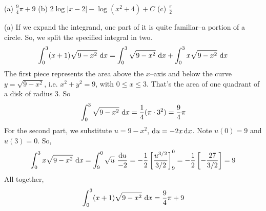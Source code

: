 \begin{answer} (a)
$\displaystyle\frac{9}{4}\pi + 9
$
\qquad (b)
$\displaystyle2 \log |x-2| -  \log (x^2 + 4) + C$
\qquad (c)
$\displaystyle\frac{\pi}{2}$
\end{answer}

\begin{solution} (a)
If we expand the integrand, one part of it is quite familiar--a portion of a circle.
So, we split the specified integral in two.
\begin{equation*}
\int_0^3(x+1)\sqrt{9-x^2} \ \mathrm{d}x
  = \int_0^3\sqrt{9-x^2} \ \mathrm{d}x
    +\int_0^3x\sqrt{9-x^2} \ \mathrm{d}x
\end{equation*}
The first piece represents the area above the $x$--axis and below the curve
$y=\sqrt{9-x^2}$, i.e. $x^2+y^2=9$, with $0\le x\le 3$. That's the area of
one quadrant of a disk of radius $3$. So
\begin{equation*}
\int_0^3\sqrt{9-x^2} \ \mathrm{d}x
 =\frac{1}{4}(\pi \cdot 3^2) = \frac{9}{4}\pi
\end{equation*}
For the second part, we substitute $u=9-x^2$, $\mathrm{d}u= -2x\,\mathrm{d}x$. Note
$u(0)=9$ and $u(3)=0$. So,
\begin{align*}
\int_0^3x\sqrt{9-x^2} \ \mathrm{d}x
= \int_9^0\sqrt{u} \ \frac{\mathrm{d}u}{-2}
=-\frac{1}{2}\left[\frac{u^{3/2}}{3/2}\right]_9^0
=-\frac{1}{2}\left[-\frac{27}{3/2}\right]
=9
\end{align*}
All together,
\begin{equation*}
\int_0^3(x+1)\sqrt{9-x^2} \ \mathrm{d}x = \frac{9}{4}\pi + 9
\end{equation*}


\end{solution}
